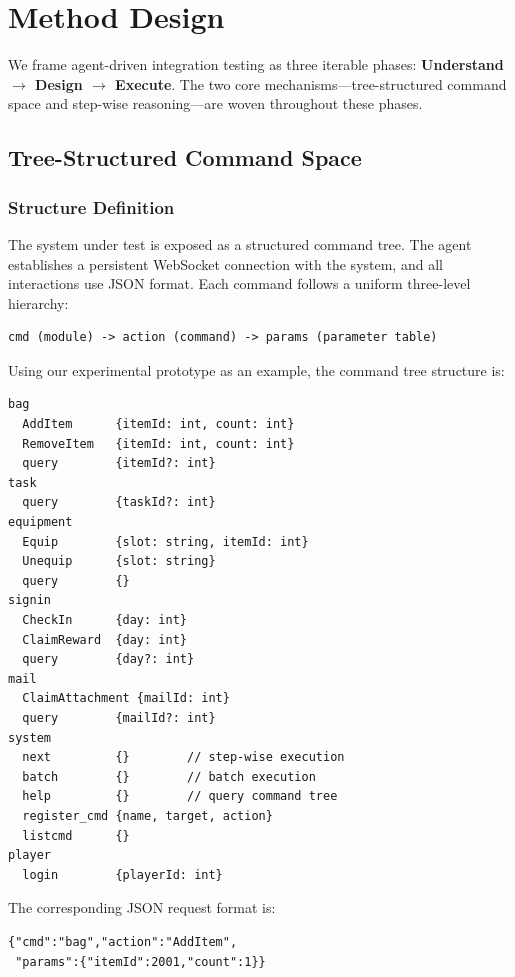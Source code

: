 \documentclass[sigconf,nonacm]{acmart}
\begin{document}
\section{Method Design}

We frame agent-driven integration testing as three iterable phases: \textbf{Understand $\to$ Design $\to$ Execute}. The two core mechanisms---tree-structured command space and step-wise reasoning---are woven throughout these phases.

\subsection{Tree-Structured Command Space}

\subsubsection{Structure Definition}

The system under test is exposed as a structured command tree. The agent establishes a persistent WebSocket connection with the system, and all interactions use JSON format. Each command follows a uniform three-level hierarchy:

\begin{lstlisting}
cmd (module) -> action (command) -> params (parameter table)
\end{lstlisting}

Using our experimental prototype as an example, the command tree structure is:

\begin{lstlisting}[basicstyle=\ttfamily\footnotesize]
bag
  AddItem      {itemId: int, count: int}
  RemoveItem   {itemId: int, count: int}
  query        {itemId?: int}
task
  query        {taskId?: int}
equipment
  Equip        {slot: string, itemId: int}
  Unequip      {slot: string}
  query        {}
signin
  CheckIn      {day: int}
  ClaimReward  {day: int}
  query        {day?: int}
mail
  ClaimAttachment {mailId: int}
  query        {mailId?: int}
system
  next         {}        // step-wise execution
  batch        {}        // batch execution
  help         {}        // query command tree
  register_cmd {name, target, action}
  listcmd      {}
player
  login        {playerId: int}
\end{lstlisting}

The corresponding JSON request format is:

\begin{lstlisting}
{"cmd":"bag","action":"AddItem",
 "params":{"itemId":2001,"count":1}}
\end{lstlisting}
\end{document}
